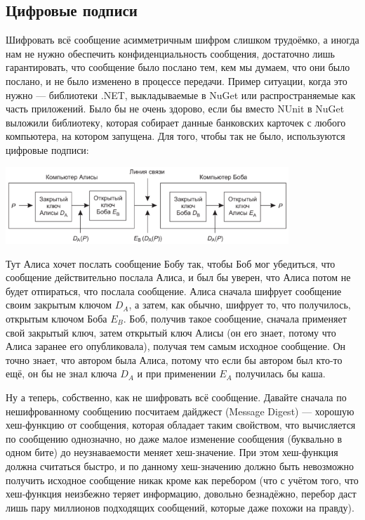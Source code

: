 \documentclass{../../text-style}
\begin{document}
\subsection{Цифровые подписи}

Шифровать всё сообщение асимметричным шифром слишком трудоёмко, а иногда нам не нужно обеспечить конфиденциальность сообщения, достаточно лишь гарантировать, что сообщение было послано тем, кем мы думаем, что они было послано, и не было изменено в процессе передачи. Пример ситуации, когда это нужно --- библиотеки .NET, выкладываемые в NuGet или распространяемые как часть приложений. Было бы не очень здорово, если бы вместо NUnit в NuGet выложили библиотеку, которая собирает данные банковских карточек с любого компьютера, на котором запущена. Для того, чтобы так не было, используются цифровые подписи:

\begin{center}
    \includegraphics[width=0.8\textwidth]{signature.png}
\end{center}

Тут Алиса хочет послать сообщение Бобу так, чтобы Боб мог убедиться, что сообщение действительно послала Алиса, и был бы уверен, что Алиса потом не будет отпираться, что послала сообщение. Алиса сначала шифрует сообщение своим закрытым ключом $D_A$, а затем, как обычно, шифрует то, что получилось, открытым ключом Боба $E_B$. Боб, получив такое сообщение, сначала применяет свой закрытый ключ, затем открытый ключ Алисы (он его знает, потому что Алиса заранее его опубликовала), получая тем самым исходное сообщение. Он точно знает, что автором была Алиса, потому что если бы автором был кто-то ещё, он бы не знал ключа $D_A$ и при применении $E_A$ получилась бы каша.

Ну а теперь, собственно, как не шифровать всё сообщение. Давайте сначала по нешифрованному сообщению посчитаем дайджест (Message Digest) --- хорошую хеш-функцию от сообщения, которая обладает таким свойством, что вычисляется по сообщению однозначно, но даже малое изменение сообщения (буквально в одном бите) до неузнаваемости меняет хеш-значение. При этом хеш-функция должна считаться быстро, и по данному хеш-значению должно быть невозможно получить исходное сообщение никак кроме как перебором (что с учётом того, что хеш-функция неизбежно теряет информацию, довольно безнадёжно, перебор даст лишь пару миллионов подходящих сообщений, которые даже похожи на правду). 
\end{document}
